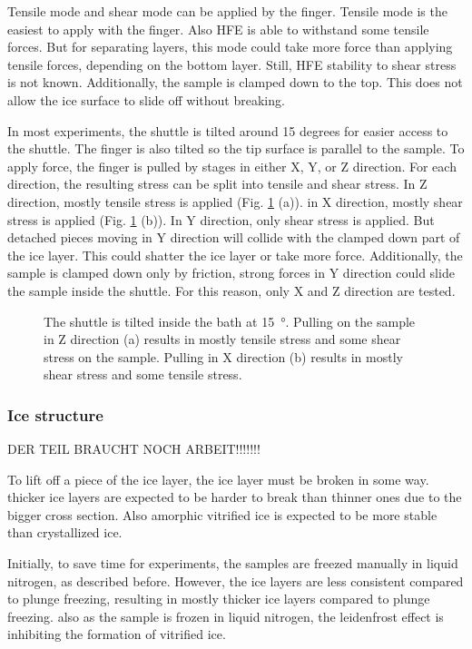 Tensile mode and shear mode can be applied by the finger. Tensile mode is the easiest to apply with the finger. Also HFE is able to withstand some tensile forces. But for separating layers, this mode could take more force than applying tensile forces, depending on the bottom layer. Still, HFE stability to shear stress is not known. Additionally, the sample is clamped down to the top. This does not allow the ice surface to slide off without breaking.

In most experiments, the shuttle is tilted around 15 degrees for easier access to the shuttle. The finger is also tilted so the tip surface is parallel to the sample. To apply force, the finger is pulled by stages in either X, Y, or Z direction. For each direction, the resulting stress can be split into tensile and shear stress. In Z direction, mostly tensile stress is applied (Fig. \ref{fig:tensilevsshear} (a)). in X direction, mostly shear stress is applied (Fig. \ref{fig:tensilevsshear} (b)). In Y direction, only shear stress is applied. But detached pieces moving in Y direction will collide with the clamped down part of the ice layer. This could shatter the ice layer or take more force. Additionally, the sample is clamped down only by friction, strong forces in Y direction could slide the sample inside the shuttle. For this reason, only X and Z direction are tested.

\begin{figure}[hbt!]
	\centering
	
	\caption{The shuttle is tilted inside the bath at \SI{15}{\degree}. Pulling on the sample in Z direction (a) results in mostly tensile stress and some shear stress on the sample. Pulling in X direction (b) results in mostly shear stress and some tensile stress.}
	\label{fig:tensilevsshear}
\end{figure}

\subsubsection{Ice structure}

DER TEIL BRAUCHT NOCH ARBEIT!!!!!!!

To lift off a piece of the ice layer, the ice layer must be broken in some way. thicker ice layers are expected to be harder to break than thinner ones due to the bigger cross section. Also amorphic vitrified ice is expected to be more stable than crystallized ice.

Initially, to save time for experiments, the samples are freezed manually in liquid nitrogen, as described before. However, the ice layers are less consistent compared to plunge freezing, resulting in mostly thicker ice layers compared to plunge freezing. also as the sample is frozen in liquid nitrogen, the leidenfrost effect is inhibiting the formation of vitrified ice.

